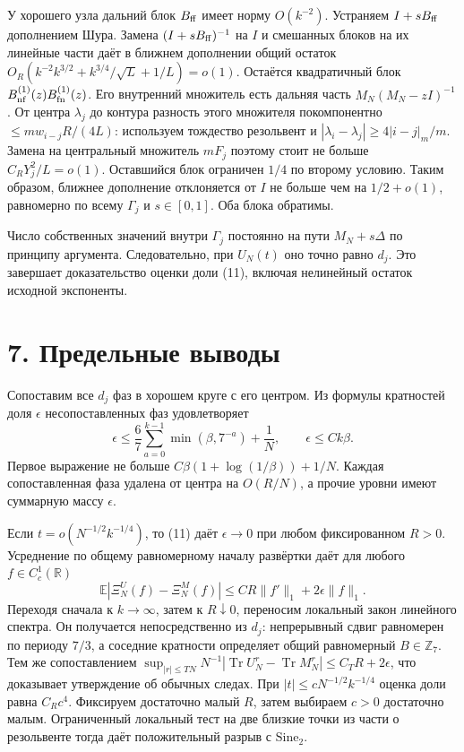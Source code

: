 \documentclass[11pt,a4paper]{article}
\newcommand{\Tr}{\operatorname{Tr}}
\newcommand{\EE}{\mathbb E}
\newcommand{\R}{\mathbb R}
\newcommand{\si}{\mathrm{Sine}_2}
\newcommand{\sect}[1]{\section*{\sffamily\color{ink}#1}}
\begin{document}
У хорошего узла дальний блок \(B_{\rm ff}\) имеет норму \(O(k^{-2})\). Устраняем \(I+sB_{\rm ff}\) дополнением Шура. Замена \((I+sB_{\rm ff})^{-1}\) на \(I\) и смешанных блоков на их линейные части даёт в ближнем дополнении общий остаток
\(O_R(k^{-2}k^{3/2}+k^{3/4}/\sqrt L+1/L)=o(1)\).
Остаётся квадратичный блок \(B_{\rm nf}^{(1)}(z)B_{\rm fn}^{(1)}(z)\). Его внутренний множитель есть дальняя часть \(M_N(M_N-zI)^{-1}\). От центра \(\lambda_j\) до контура разность этого множителя покомпонентно \(\le m w_{i-j}R/(4L)\): используем тождество резольвент и \(|\lambda_i-\lambda_j|\ge4|i-j|_m/m\). Замена на центральный множитель \(m F_j\) поэтому стоит не больше \(C_R Y_j^2/L=o(1)\). Оставшийся блок ограничен \(1/4\) по второму условию. Таким образом, ближнее дополнение отклоняется от \(I\) не больше чем на \(1/2+o(1)\), равномерно по всему \(\Gamma_j\) и \(s\in[0,1]\). Оба блока обратимы.

Число собственных значений внутри \(\Gamma_j\) постоянно на пути \(M_N+s\Delta\) по принципу аргумента. Следовательно, при \(U_N(t)\) оно точно равно \(d_j\). Это завершает доказательство оценки доли (11), включая нелинейный остаток исходной экспоненты.
\newpage
\sect{7. Предельные выводы}
Сопоставим все \(d_j\) фаз в хорошем круге с его центром. Из формулы кратностей доля \(\epsilon\) несопоставленных фаз удовлетворяет
\[
 \epsilon\le \frac67\sum_{a=0}^{k-1}\min(\beta,7^{-a})+\frac1N,
       \qquad \epsilon\le C k\beta.
\]
Первое выражение не больше \(C\beta(1+\log(1/\beta))+1/N\). Каждая сопоставленная фаза удалена от центра на \(O(R/N)\), а прочие уровни имеют суммарную массу \(\epsilon\).

Если \(t=o(N^{-1/2}k^{-1/4})\), то (11) даёт \(\epsilon\to0\) при любом фиксированном \(R>0\). Усреднение по общему равномерному началу развёртки даёт для любого \(f\in C_c^1(\R)\)
\[
 \EE|\Xi_N^{U}(f)-\Xi_N^{M}(f)|
                     \le C R\|f'\|_1+2\epsilon\|f\|_1 .
\]
Переходя сначала к \(k\to\infty\), затем к \(R\downarrow0\), переносим локальный закон линейного спектра. Он получается непосредственно из \(d_j\): непрерывный сдвиг равномерен по периоду \(7/3\), а соседние кратности определяет общий равномерный \(B\in\mathbb Z_7\). Тем же сопоставлением \(\sup_{|r|\le TN}N^{-1}|\Tr U_N^r-\Tr M_N^r|\le C_T R+2\epsilon\), что доказывает утверждение об обычных следах. При \(|t|\le c N^{-1/2}k^{-1/4}\) оценка доли равна \(C_Rc^4\). Фиксируем достаточно малый \(R\), затем выбираем \(c>0\) достаточно малым. Ограниченный локальный тест на две близкие точки из части о резольвенте тогда даёт положительный разрыв с \(\si\).
\end{document}
